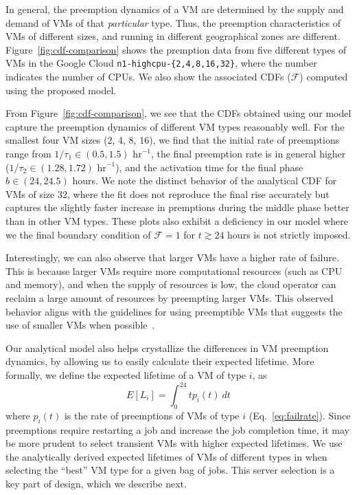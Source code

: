 In general, the preemption dynamics of a VM are determined by the supply and demand of VMs of that \emph{particular} type.
Thus, the preemption characteristics of VMs of different sizes, and running in different geographical zones are different.
Figure~\ref{fig:cdf-comparison} shows the premption data from five different types of VMs in the Google Cloud \texttt{n1-highcpu-\{2,4,8,16,32\}}, where the number indicates the number of CPUs. We also show the associated CDFs ($\mathscr{F}$) computed using the proposed model. %

From Figure~\ref{fig:cdf-comparison}, we see that the CDFs obtained using our model capture the preemption dynamics of different VM types reasonably well. For the smallest four VM sizes (2, 4, 8, 16), we find that the initial rate of preemptions range from $1/\tau_1 \in (0.5, 1.5)$ $\text{hr}^{-1}$, the final preemption rate is in general higher ($1/\tau_2 \in (1.28, 1.72)$  $\text{hr}^{-1}$), and the activation time for the final phase $b \in (24,24.5)$ hours. We note the distinct behavior of the analytical CDF for VMs of size 32, where the fit does not reproduce the final rise accurately but captures the slightly faster increase in premptions during the middle phase better than in other VM types. These plots also exhibit a deficiency in our model where we the final boundary condition of $\mathscr{F} = 1$ for $t\gtrsim 24$ hours is not strictly imposed.

Interestingly, we can also observe that larger VMs have a higher rate of failure.
This is because larger VMs require more computational resources (such as CPU and memory), and when the supply of resources is low, the cloud operator can reclaim a large amount of resources by preempting larger VMs.
This observed behavior aligns with the guidelines for using preemptible VMs that suggests the use of smaller VMs when possible~\cite{gcp-preempt-faq}. 

Our analytical model also helps crystallize the differences in VM preemption dynamics, by allowing us to easily calculate their expected lifetime. 
More formally, we define the expected lifetime of a VM of type $i$, as 
\begin{equation}
  \label{eq:expected-lifetime}
E[L_i] =  \int_{0}^{24} t {p_i}(t)~dt 
\end{equation}
where $p_i(t)$ is the rate of preemptions of VMs of type $i$ (Eq.~\ref{eq:failrate}).
%
Since preemptions require restarting a job and increase the job completion time, it may be more prudent to select transient VMs with higher expected lifetimes. We use the analytically derived expected lifetimes of VMs of different types in \sysname when selecting the ``best'' VM type for a given bag of jobs. This server selection is a key part of \sysname design, which we describe next. 

